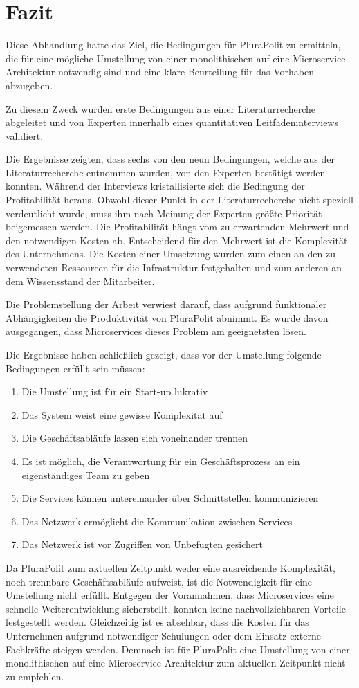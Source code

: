 \section{Fazit}

Diese Abhandlung hatte das Ziel, die Bedingungen für PluraPolit zu ermitteln, die für eine mögliche Umstellung von einer monolithischen auf eine Microservice-Architektur notwendig sind und eine klare Beurteilung für das Vorhaben abzugeben. 
 
 Zu diesem Zweck wurden erste Bedingungen aus einer Literaturrecherche abgeleitet und von Experten innerhalb eines quantitativen Leitfadeninterviews validiert.

Die Ergebnisse zeigten, dass sechs von den neun Bedingungen, 
welche aus der Literaturrecherche entnommen wurden, von den Experten bestätigt werden konnten. Während der Interviews kristallisierte sich die Bedingung der Profitabilität heraus. Obwohl dieser Punkt in der Literaturrecherche nicht speziell verdeutlicht wurde, muss ihm nach Meinung der Experten größte Priorität beigemessen werden. Die Profitabilität hängt vom zu erwartenden Mehrwert und den notwendigen Kosten ab. Entscheidend für den Mehrwert ist die Komplexität des Unternehmens. Die Kosten einer Umsetzung wurden zum einen an den zu verwendeten Ressourcen für die Infrastruktur festgehalten und zum anderen an dem Wissensstand der Mitarbeiter.

Die Problemstellung der Arbeit verwiest darauf, dass aufgrund funktionaler Abhängigkeiten die Produktivität von PluraPolit abnimmt. Es wurde davon ausgegangen, dass Microservices dieses Problem am geeignetsten lösen.
 
Die Ergebnisse haben schließlich gezeigt, dass vor der Umstellung folgende Bedingungen erfüllt sein müssen:
\begin{enumerate}
	\item Die Umstellung ist für ein Start-up lukrativ
	\item Das System weist eine gewisse Komplexität auf
	\item Die Geschäftsabläufe lassen sich voneinander trennen
	\item Es ist möglich, die Verantwortung für ein Geschäftsprozess an ein eigenständiges Team zu geben
	\item Die Services können untereinander über Schnittstellen kommunizieren
	\item Das Netzwerk ermöglicht die Kommunikation zwischen Services
	\item Das Netzwerk ist vor Zugriffen von Unbefugten gesichert
\end{enumerate}

Da PluraPolit zum aktuellen Zeitpunkt weder eine ausreichende Komplexität, noch trennbare Geschäftsabläufe aufweist, ist die Notwendigkeit für eine Umstellung nicht erfüllt. Entgegen der Vorannahmen, dass Microservices eine schnelle Weiterentwicklung sicherstellt, konnten keine nachvollziehbaren Vorteile festgestellt werden. Gleichzeitig ist es absehbar, dass die Kosten für das Unternehmen aufgrund notwendiger Schulungen oder dem Einsatz externe Fachkräfte steigen werden. Demnach ist für PluraPolit eine Umstellung von einer monolithischen auf eine Microservice-Architektur zum aktuellen Zeitpunkt nicht zu empfehlen.
